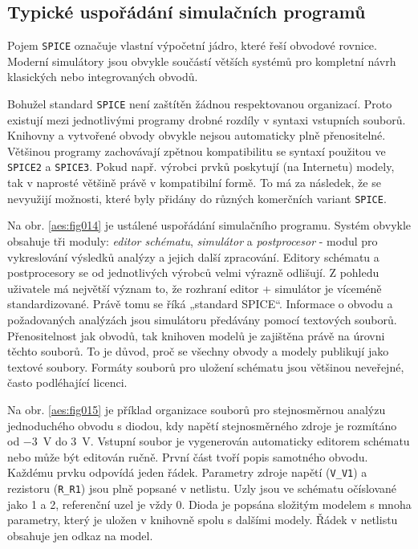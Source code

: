     \subsection{Typické uspořádání simulačních programů}
      Pojem \texttt{SPICE} označuje vlastní výpočetní jádro, které řeší obvodové rovnice. Moderní
      simulátory jsou obvykle součástí větších systémů pro kompletní návrh klasických nebo
      integrovaných obvodů.

      Bohužel standard \texttt{SPICE} není zaštítěn žádnou respektovanou organizací. Proto existují
      mezi jednotlivými programy drobné rozdíly v syntaxi vstupních souborů. Knihovny a vytvořené
      obvody obvykle nejsou automaticky plně přenositelné. Většinou programy zachovávají zpětnou
      kompatibilitu se syntaxí použitou ve \texttt{SPICE2} a \texttt{SPICE3}. Pokud např. výrobci
      prvků poskytují (na Internetu) modely, tak v naprosté většině právě v kompatibilní formě. To
      má za následek, že se nevyužijí možnosti, které byly přidány do různých komerčních variant
      \texttt{SPICE}.

      Na obr. \ref{aes:fig014} je ustálené uspořádání simulačního programu. Systém obvykle obsahuje
      tři moduly: \emph{editor schématu}, \emph{simulátor} a \emph{postprocesor} - modul pro
      vykreslování výsledků analýzy a jejich další zpracování. Editory schématu a postprocesory se
      od jednotlivých výrobců velmi výrazně odlišují. Z pohledu uživatele má největší význam to, že
      rozhraní editor + simulátor je víceméně standardizované. Právě tomu se říká „standard SPICE“.
      Informace o obvodu a požadovaných analýzách jsou simulátoru předávány pomocí textových
      souborů. Přenositelnost jak obvodů, tak knihoven modelů je zajištěna právě na úrovni těchto
      souborů. To je důvod, proč se všechny obvody a modely publikují jako textové soubory. Formáty
      souborů pro uložení schématu jsou většinou neveřejné, často podléhající licenci.


      Na obr. \ref{aes:fig015} je příklad organizace souborů pro stejnosměrnou analýzu jednoduchého
      obvodu s diodou, kdy napětí stejnosměrného zdroje je rozmítáno od \SI{-3}{\V} do \SI{+3}{\V}.
      Vstupní soubor je vygenerován automaticky editorem schématu nebo může být editován ručně.
      První část tvoří popis samotného obvodu. Každému prvku odpovídá jeden řádek. Parametry zdroje
      napětí (\texttt{V\_V1}) a rezistoru (\texttt{R\_R1}) jsou plně popsané v netlistu. Uzly jsou
      ve schématu očíslované jako \num{1} a \num{2}, referenční uzel je vždy \num{0}. Dioda je
      popsána složitým modelem s mnoha parametry, který je uložen v knihovně spolu s dalšími modely.
      Řádek v netlistu obsahuje jen odkaz na model.


